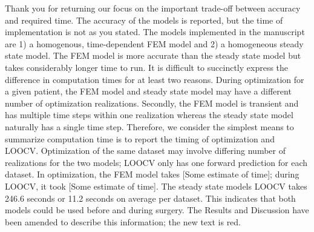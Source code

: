 \documentclass[letterpaper,12pt]{report}
\begin{document}
\begin{enumerate}
{Thank you for returning our focus on the important
trade-off between accuracy and required time.
The accuracy of the models is reported, but the time of implementation
is not as you stated. The models implemented in the manuscript are 1) a homogenous,
time-dependent FEM model and 2) a homogeneous steady state model. The
FEM model is more accurate than the steady state model but takes considerably longer time
to run. It is difficult to succinctly express the difference in
computation times for at least two
reasons. During optimization for a given patient,
the FEM model and steady state model may have a different
number of optimization realizations. Secondly, the FEM model is transient and has multiple time steps within
one realization whereas the steady state model naturally has a single time step. Therefore, we
consider the simplest means to summarize computation time is to report the timing of optimization and LOOCV.
Optimization of the same dataset may involve differing number of realizations for the two models; LOOCV only
has one forward prediction for each dataset. In optimization, the FEM model takes {\color{green}[Some estimate of time]}; during LOOCV, it took
{\color{green}[Some estimate of time]}. The steady
state models LOOCV takes 246.6 seconds or 11.2 seconds on average per dataset. This indicates that both models
could be used before and during surgery. The Results
and Discussion have been amended to describe this
information; the new text is red.
}
\end{enumerate}
\end{document}
